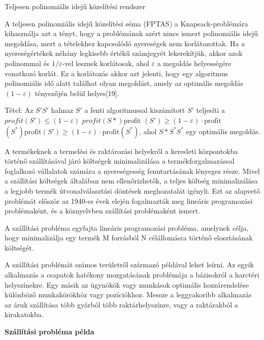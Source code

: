 	Teljesen polinomiális idejű közelítési rendszer
	
	A teljesen polinomiális idejű közelítési séma (FPTAS) a Knapsack-problémára kihasználja azt a tényt, hogy a problémának azért nincs ismert polinomiális idejű megoldása, mert a tételekhez kapcsolódó nyereségek nem korlátozottak. Ha a nyereségértékek néhány legkisebb értékű számjegyét lekerekítjük, akkor azok polinommal és $1/\varepsilon$-vel lesznek korlátosak, ahol $\varepsilon$ a megoldás helyességére vonatkozó korlát. Ez a korlátozás akkor azt jelenti, hogy egy algoritmus polinomiális idő alatt találhat olyan megoldást, amely az optimális megoldás $(1-\varepsilon)$ tényezőjén belül helyes[19].
	
	Tétel: Az $S' {\displaystyle S'}$ halmaz 
	$S'$ 
	a fenti algoritmussal kiszámított 
	$S'$ 
	teljesíti a 
	$profit( S') \leq ( 1 - \varepsilon )$
	$profit(S*) {\displaystyle \mathrm {profit}}$
	$(S')\geq (1-\varepsilon )\cdot \mathrm {profit}$
	$(S^{*}) \mathrm {profit} (S')\geq (1-\varepsilon )\cdot \mathrm {profit} (S^{*})$, 
	ahol $S*{\displaystyle S^{*}} S^{*}$ egy optimális megoldás.
	
	
	A termékeknek a termelési és raktározási helyekről a keresleti központokba történő szállításával járó költségek minimalizálása a termékforgalmazással foglalkozó vállalatok számára a nyereségesség fenntartásának lényeges része. Mivel a szállítási költségek általában nem ellenőrizhetők, a teljes költség minimalizálása a legjobb termék útvonalválasztási döntések meghozatalát igényli. Ezt az alapvető problémát először az 1940-es évek elején fogalmazták meg lineáris programozási problémaként, és a köznyelvben szállítási problémaként ismert.
	
	
	
	A szállítási probléma egyfajta lineáris programozási probléma, amelynek célja, hogy minimalizálja egy termék M forrásból N célállomásra történő elosztásának költségét.
	
	A szállítási problémát számos területről származó példával lehet leírni. Az egyik alkalmazás a csapatok hatékony mozgatásának problémája a bázisokról a harctéri helyszínekre. Egy másik az ügynökök vagy munkások optimális hozzárendelése különböző munkakörökhöz vagy pozíciókhoz. Messze a leggyakoribb alkalmazás az áruk szállítása több gyárból több raktárhelyszínre, vagy a raktárakból a kirakatokba.
	
	\textbf{Szállítási probléma példa}
	

